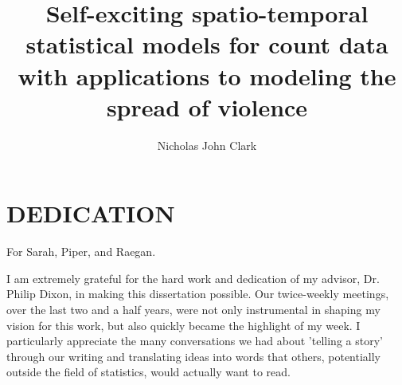 \documentclass[11pt]{isuthesis}
\begin{document}
\title{Self-exciting spatio-temporal statistical models for count data with applications to modeling the spread of violence}
\author{Nicholas John Clark}
\notice
\maketitle

\chapter*{DEDICATION}
For Sarah, Piper, and Raegan.  

\tableofcontents
{} \cleardoublepage {}
{}
\listoftables
\cleardoublepage {} {}
\listoffigures
\cleardoublepage {}
{}
I am extremely grateful for the hard work and dedication of my advisor, Dr. Philip Dixon, in making this dissertation possible.  Our twice-weekly meetings, over the last two and a half years, were not only instrumental in shaping my vision for this work, but also quickly became the highlight of my week.  I particularly appreciate the many conversations we had about 'telling a story' through our writing and translating ideas into words that others, potentially outside the field of statistics, would actually want to read.
\end{document}
